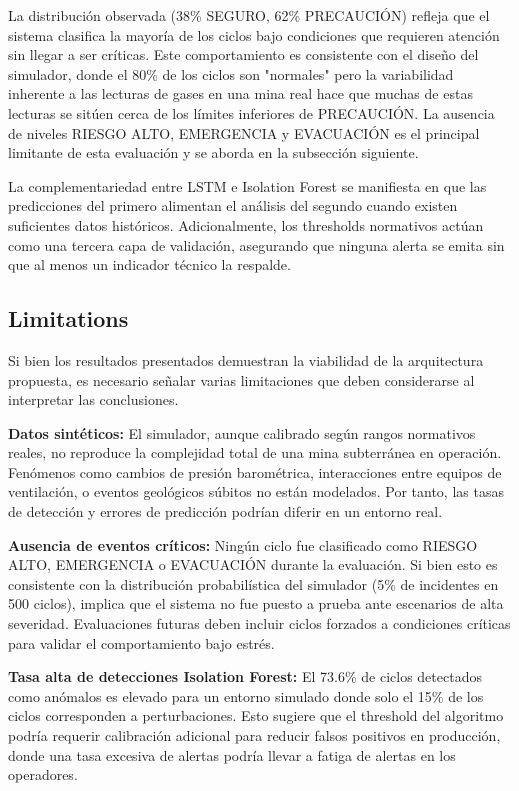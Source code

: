 \documentclass[journal,onecolumn]{IEEEtran}
\begin{document}
La distribución observada (38\% SEGURO, 62\% PRECAUCIÓN) refleja que el sistema clasifica la mayoría de los ciclos bajo condiciones que requieren atención sin llegar a ser críticas. Este comportamiento es consistente con el diseño del simulador, donde el 80\% de los ciclos son "normales" pero la variabilidad inherente a las lecturas de gases en una mina real hace que muchas de estas lecturas se sitúen cerca de los límites inferiores de PRECAUCIÓN. La ausencia de niveles RIESGO ALTO, EMERGENCIA y EVACUACIÓN es el principal limitante de esta evaluación y se aborda en la subsección siguiente.

La complementariedad entre LSTM e Isolation Forest se manifiesta en que las predicciones del primero alimentan el análisis del segundo cuando existen suficientes datos históricos. Adicionalmente, los thresholds normativos actúan como una tercera capa de validación, asegurando que ninguna alerta se emita sin que al menos un indicador técnico la respalde.

\subsection{Limitations}

Si bien los resultados presentados demuestran la viabilidad de la arquitectura propuesta, es necesario señalar varias limitaciones que deben considerarse al interpretar las conclusiones.

\textbf{Datos sintéticos:} El simulador, aunque calibrado según rangos normativos reales, no reproduce la complejidad total de una mina subterránea en operación. Fenómenos como cambios de presión barométrica, interacciones entre equipos de ventilación, o eventos geológicos súbitos no están modelados. Por tanto, las tasas de detección y errores de predicción podrían diferir en un entorno real.

\textbf{Ausencia de eventos críticos:} Ningún ciclo fue clasificado como RIESGO ALTO, EMERGENCIA o EVACUACIÓN durante la evaluación. Si bien esto es consistente con la distribución probabilística del simulador (5\% de incidentes en 500 ciclos), implica que el sistema no fue puesto a prueba ante escenarios de alta severidad. Evaluaciones futuras deben incluir ciclos forzados a condiciones críticas para validar el comportamiento bajo estrés.

\textbf{Tasa alta de detecciones Isolation Forest:} El 73.6\% de ciclos detectados como anómalos es elevado para un entorno simulado donde solo el 15\% de los ciclos corresponden a perturbaciones. Esto sugiere que el threshold del algoritmo podría requerir calibración adicional para reducir falsos positivos en producción, donde una tasa excesiva de alertas podría llevar a fatiga de alertas en los operadores.
\end{document}
